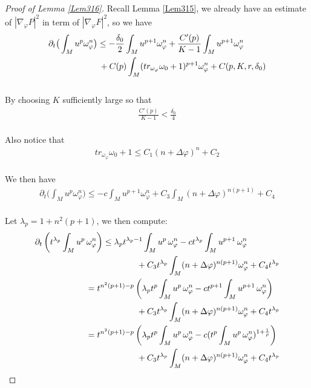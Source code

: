 \documentclass[11pt]{amsart}
\numberwithin{equation}{section}
\begin{document}
\begin{proof}[Proof of Lemma \ref{Lem316}]
\noindent
Recall Lemma \ref{Lem315}, we already have an estimate of $|\nabla_\varphi P|^2$ in term of $|\nabla_\varphi F|^2$, so we have 
\begin{align}
	& \partial_t\big( \int_M u^p\omega_\varphi^n\big)\le  -\frac{\delta_0}{2} \int_M u^{p+1}\omega_\varphi^n + \frac{C'(p)}{K-1}\int_M u^{p+1}\omega_\varphi^n \notag\\
	&\quad\quad\quad\quad\quad\quad + C(p) \int_M (tr_{\omega_{\varphi}}\omega_0+1)^{p+1} \omega_\varphi^n + C(p,K,r,\delta_0)
\end{align}\\
By choosing $K$ sufficiently large so that 
\begin{align}
	\frac{C'(p)}{K-1} < \frac{\delta_0}{4}
\end{align}\\
Also notice that 
\begin{align}
	tr_{\omega_{\varphi}}\omega_0+1\le  C_1 (n+\Delta \varphi)^n+C_2
\end{align}\\
We then have 
\begin{align}
	\partial_t\big( \int_M u^p\omega_\varphi^n\big)\le  -c \int_M u^{p+1}\omega_\varphi^n + C_3 \int_M (n+\Delta\varphi)^{n(p+1)} + C_4
\end{align}\\
\noindent
Let \( \lambda_p =1+n^2(p+1) \), we then compute:
\begin{align}
	& \partial_t \left( t^{\lambda_p} \int_M u^p \, \omega_{\varphi}^n \right) \le  \lambda_p t^{\lambda_p - 1} \int_M u^p \, \omega_{\varphi}^n - c t^{\lambda_p} \int_M u^{p +1} \, \omega_{\varphi}^n \notag\\
	&\qquad\qquad\qquad\qquad\qquad\qquad + C_3t^{\lambda_p} \int_M (n+\Delta\varphi)^{n(p+1)} \omega_{\varphi}^n + C_4t^{\lambda_p}  \notag \\
	&\qquad\qquad\qquad = t^{n^2(p+1)-p} \left( \lambda_p t^p \int_M u^p \, \omega_{\varphi}^n -ct^{p+1}\int_M u^{p+1}\,\omega_\varphi^n \right) \notag\\
	&\qquad\qquad\qquad\qquad\qquad\qquad + C_3t^{\lambda_p} \int_M (n+\Delta\varphi)^{n(p+1)} \omega_{\varphi}^n + C_4t^{\lambda_p} \notag\\
	&\qquad\qquad\qquad = t^{n^2(p+1)-p} \left( \lambda_p t^p \int_M u^p \, \omega_{\varphi}^n -c(t^p \int_M u^p \, \omega_{\varphi}^n)^{1+\frac{1}{p}} \right) \notag\\
	&\qquad\qquad\qquad\qquad\qquad\qquad + C_3t^{\lambda_p} \int_M (n+\Delta\varphi)^{n(p+1)} \omega_{\varphi}^n + C_4t^{\lambda_p}

\end{align}
\end{proof}
\end{document}
